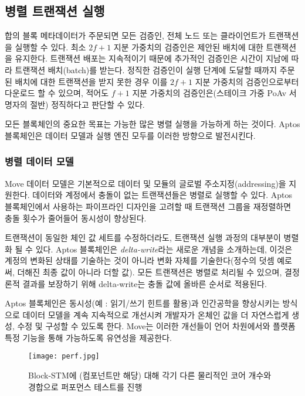 \documentclass{article}
\begin{document}
\subsection{병렬 트랜잭션 실행}
\label{subsec:parallel_transaction_execution}

합의 블록 메타데이터가 주문되면 모든 검증인, 전체 노드 또는 클라이언트가 트랜잭션을 실행할 수 있다. 최소 $2f + 1$ 지분 가중치의 검증인은 제안된 배치에 대한 트랜잭션을 유지한다. 트랜잭션 배포는 지속적이기 때문에 추가적인 검증인은 시간이 지남에 따라 트랜잭션 배치(batch)를 받는다. 정직한 검증인이 실행 단계에 도달할 때까지 주문된 배치에 대한 트랜잭션을 받지 못한 경우 이를 $2f + 1$ 지분 가중치의 검증인으로부터 다운로드 할 수 있으며, 적어도 $f + 1$ 지분 가중치의 검증인은(스테이크 가중 PoAv 서명자의 절반) 정직하다고 판단할 수 있다.

모든 블록체인의 중요한 목표는 가능한 많은 병렬 실행을 가능하게 하는 것이다. Aptos 블록체인은 데이터 모델과 실행 엔진 모두를 이러한 방향으로 발전시킨다.

\subsubsection{병렬 데이터 모델}

Move 데이터 모델은 기본적으로 데이터 및 모듈의 글로벌 주소지정(addressing)을 지원한다. 데이터와 계정에서 충돌이 없는 트랜잭션들은 병렬로 실행할 수 있다. Aptos 블록체인에서 사용하는 파이프라인 디자인을 고려할 때 트랜잭션 그룹을 재정렬하면 충돌 횟수가 줄어들어 동시성이 향상된다.

트랜잭션이 동일한 체인 값 세트를 수정하더라도, 트랜잭션 실행 과정의 대부분이 병렬화 될 수 있다. Aptos 블록체인은 \emph{delta-write}라는 새로운 개념을 소개하는데, 이것은 계정의 변화된 상태를 기술하는 것이 아니라 변화 자체를 기술한다(정수의 덧셈 예로써, 더해진 최종 값이 아니라 더할 값). 모든 트랜잭션은 병렬로 처리될 수 있으며, 결정론적 결과를 보장하기 위해 delta-write는 충돌 값에 올바른 순서로 적용된다.

Aptos 블록체인은 동시성(예 : 읽기/쓰기 힌트를 활용)과 인간공학을 향상시키는 방식으로 데이터 모델을 계속 지속적으로 개선시켜 개발자가 온체인 값을 더 자연스럽게 생성, 수정 및 구성할 수 있도록 한다. Move는 이러한 개선들이 언어 차원에서와 플랫폼 특정 기능을 통해 가능하도록 유연성을 제공한다.


\begin{figure}
\centering
\texttt{[image: perf.jpg]}
\caption{\label{fig:perf}Block-STM에 (컴포넌트만 해당) 대해 각기 다른 물리적인 코어 개수와 경합으로 퍼포먼스 테스트를 진행}
\end{figure}
\end{document}
